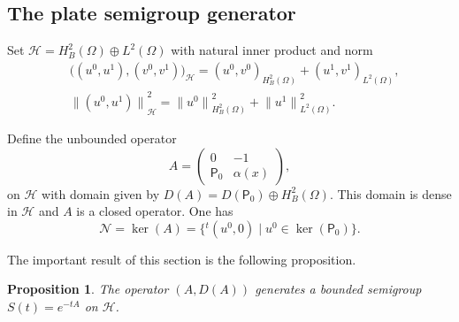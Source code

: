 \documentclass[JEP,XML,SOM,Unicode,published]{cedram}
\let\sep\mid
\theoremstyle{plain}
\newtheorem{proposition}[theorem]{Proposition}
\theoremstyle{definition}
\newcommand{\inp}[2]{(#1, #2)}
\newcommand{\biginp}[2]{\big(#1, #2 \big)}
\renewcommand{\H}{{\mathcal H}}
\newcommand{\transp}{\ensuremath{\phantom{}^{t}}}
\newcommand{\Norm}[2]{{\| #1 \|}_{#2}}
\newcommand{\bigNorm}[2]{{\big\| #1 \big\|}_{#2}}
\newcommand{\Pell}{\mathsf P_0}
\begin{document}
\subsection{The plate semigroup generator}
\label{sec: The plate semigroup generator}
Set $\H = H^2_B (\Omega) \oplus L^2(\Omega)$ with natural inner
product and norm
\begin{align}
\label{eq: norm H}
&\biginp{(u^0,u^1)}{(v^0,v^1)}_{\H} = \inp{u^0}{v^0}_{H^2_B(\Omega)} +
\inp{u^1}{v^1}_{L^2(\Omega)}, \\
&\bigNorm{(u^0,u^1)}{\H}^2 = \Norm{u^0}{H^2_B(\Omega)}^2 + \Norm{u^1}{L^2(\Omega)}^2.
\end{align}

Define the unbounded operator
\begin{equation}
\label{eq: generator damped plate}
A = \begin{pmatrix} 0 & -1\\ \Pell & \alpha(x) \end{pmatrix},
\end{equation}
on $\H$
with domain given by $D(A) = D(\Pell) \oplus H^2_B(\Omega)$.
This domain is dense in $\H$ and $A$ is a closed operator. One has
\begin{equation*}
\mathcal N = \ker (A) = \big\{ \transp (u^0, 0)\sep u^0 \in \ker
(\Pell)\big\}.
\end{equation*}

The important result of this section is the following proposition.

\begin{proposition}
\label{prop: A semigroup generator}
The operator $(A, D(A))$ generates a bounded semigroup $S(t) = e^{-t
A}$ on $\H$.
\end{proposition}
\end{document}
